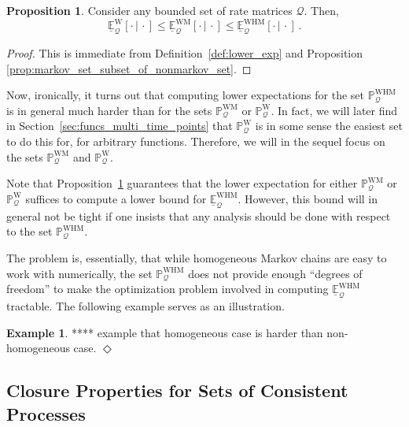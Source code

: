 \documentclass[10pt,a4paper]{paper}
\theoremstyle{definition}
\newtheorem{exmp}{Example}%
\newtheorem{proposition}[theorem]{Proposition}
\newcommand{\processes}{\mathbb{P}}
\newcommand{\wprocesses}{\processes^{\mathrm{W}}}
\newcommand{\wmprocesses}{\processes^{\mathrm{WM}}}
\newcommand{\whmprocesses}{\processes^{\mathrm{WHM}}}
\newcommand{\rateset}{\mathcal{Q}}
\newcommand{\exampleend}{\hfill$\Diamond$}
\begin{document}
\begin{proposition}\label{prop:lower_exp_markov_bounded_by_nonmarkov}
Consider any bounded set of rate matrices $\rateset$. Then,
\begin{equation*}
\underline{\mathbb{E}}_\rateset^\mathrm{W}[\cdot\,\vert\,\cdot] \leq
\underline{\mathbb{E}}_\rateset^\mathrm{WM}[\cdot\,\vert\,\cdot] \leq
\underline{\mathbb{E}}_\rateset^\mathrm{WHM}[\cdot\,\vert\,\cdot]\,.
\end{equation*}
\end{proposition}
\begin{proof}
This is immediate from Definition~\ref{def:lower_exp} and Proposition \ref{prop:markov_set_subset_of_nonmarkov_set}.
\end{proof}

Now, ironically, it turns out that computing lower expectations for the set $\whmprocesses_\rateset$ is in general much harder than for the sets $\wmprocesses_\rateset$ or $\wprocesses_\rateset$. In fact, we will later find in Section~\ref{sec:funcs_multi_time_points} that $\wprocesses_\rateset$ is in some sense the easiest set to do this for, for arbitrary functions. Therefore, we will in the sequel focus on the sets $\wmprocesses_\rateset$ and $\wprocesses_\rateset$.

Note that Proposition~\ref{prop:lower_exp_markov_bounded_by_nonmarkov} guarantees that the lower expectation for either $\wmprocesses_\rateset$ or $\wprocesses_\rateset$ suffices to compute a lower bound for $\underline{\mathbb{E}}_\rateset^\mathrm{WHM}$. However, this bound will in general not be tight if one insists that any analysis should be done with respect to the set $\whmprocesses_\rateset$.

The problem is, essentially, that while homogeneous Markov chains are easy to work with numerically, the set $\whmprocesses_\rateset$ does not provide enough ``degrees of freedom'' to make the optimization problem involved in computing $\underline{\mathbb{E}}^\mathrm{WHM}_\rateset$ tractable. The following example serves as an illustration.

\begin{exmp}
**** example that homogeneous case is harder than non-homogeneous case.
\exampleend
\end{exmp}

\subsection{Closure Properties for Sets of Consistent Processes}
\end{document}
